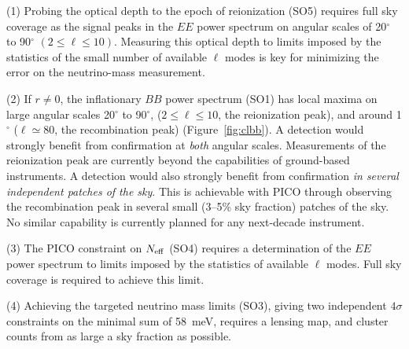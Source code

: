 \documentclass[PICOReport.tex]{subfiles}
\begin{document}
(1) Probing the optical depth to the epoch of reionization (SO5) requires full sky coverage as the signal peaks in the $EE$ power spectrum on angular scales of 20$^\circ$ to 90$^\circ$ $(2 \leq \ell \leq 10)$. Measuring this optical depth to limits imposed by the statistics of the small number of available $\ell$ modes is key for minimizing the error on the neutrino-mass measurement. 

(2) If $r \ne 0 $, the inflationary $BB$ power spectrum (SO1) has local maxima on large angular scales 20$^\circ$ to 90$^\circ$, ($ 2 \leq \ell \leq 10$, the reionization peak), and around 1$^\circ$ ($ \ell \simeq 80$, the recombination peak) (Figure~\ref{fig:clbb}). A detection would strongly benefit from confirmation at {\it both} angular scales. Measurements of the reionization peak are currently beyond the capabilities of ground-based instruments. A detection would also strongly benefit from confirmation  {\it in several independent patches of the sky}. This is achievable with PICO through observing the recombination peak in several small (3--5\% sky fraction) patches of the sky. No similar capability is currently planned for any next-decade instrument.  

(3) The PICO constraint on $N_{\rm eff}$ (SO4) requires a determination of the $EE$ power spectrum to limits imposed by the statistics of available $\ell$ modes. Full sky coverage is required to achieve this limit.  

(4) Achieving the targeted neutrino mass limits (SO3), giving two independent $4\sigma$ constraints on the minimal sum of 58~meV, requires a lensing map, and cluster counts from as large a sky fraction as possible. 
\end{document}
